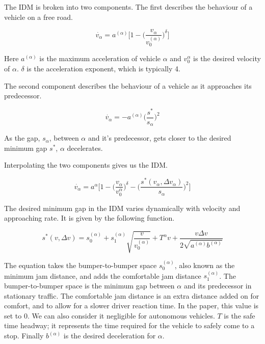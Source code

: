 The IDM is broken into two components. The first describes the behaviour of a vehicle on a free road.

\begin{equation}
\dot{v_\alpha} = a^{(\alpha)}\Biggl[1 - \biggl(\frac{v_\alpha}{v_0^{(\alpha)}}\biggr)^\delta\Biggr]
\end{equation}

Here $a^{(\alpha)}$ is the maximum acceleration of vehicle $\alpha$ and $v_0^{\alpha}$ is the desired velocity of $\alpha$. $\delta$ is the acceleration exponent, which is typically 4. 

The second component describes the behaviour of a vehicle as it approaches its predecessor. 

\begin{equation}
\dot{v_\alpha} = - a^{(\alpha)}\biggl(\frac{s^*}{s_\alpha}\biggr)^2
\end{equation}

As the gap, $s_\alpha$, between $\alpha$ and it's predecessor, gets closer to the desired minimum gap $s^*$, $\alpha$ decelerates.

Interpolating the two components gives us the IDM. 

\begin{equation}
\dot{v_\alpha} = a^{\alpha}\Biggl[1 - \biggl(\frac{v_\alpha}{v_0^\alpha}\biggr)^\delta - \biggl(\frac{s^*(v_\alpha,\Delta v_\alpha)}{s_\alpha}\biggr)^2\Biggr]
\end{equation}

The desired minimum gap in the IDM varies dynamically with velocity and approaching rate. It is given by the following function.

\begin{equation}\label{IDMSpacingFunction}
s^*(v,\Delta v) = s_0^{(\alpha)} + s_1^{(\alpha)}\sqrt{\frac{v}{v_0^{(\alpha)}}} + T^\alpha v + \frac{v\Delta v}{2\sqrt{a^{(\alpha)}b^{(\alpha)}}}
\end{equation}

The equation takes the bumper-to-bumper space $s_0^{(\alpha)}$, also known as the minimum jam distance, and adds the comfortable jam distance $s_1^{(\alpha)}$. The bumper-to-bumper space is the minimum gap between $\alpha$ and its predecessor in stationary traffic. The comfortable jam distance is an extra distance added on for comfort, and to allow for a slower driver reaction time. In the paper, this value is set to 0. We can also consider it negligible for autonomous vehicles. $T$ is the safe time headway; it represents the time required for the vehicle to safely come to a stop. Finally $b^{(\alpha)}$ is the desired deceleration for $\alpha$.

